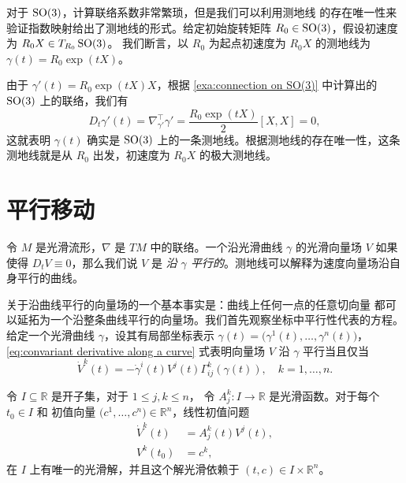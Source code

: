 \begin{example}[$\SO(3)$ 中的测地线]\label{exa:geodesics on SO(3)}
  对于 $\SO(3)$，计算联络系数非常繁琐，但是我们可以利用测地线
  的存在唯一性来验证指数映射给出了测地线的形式。给定初始旋转矩阵
  $R_0\in \operatorname{SO}(3)$，假设初速度为 $R_0X\in T_{R_0}\operatorname{SO}(3)$。
  我们断言，以 $R_0$ 为起点初速度为 $R_0 X$ 的测地线为 $\gamma(t)=R_0\exp(tX)$。

  由于 $\gamma'(t)=R_0\exp(tX) X$，根据 \autoref{exa:connection on SO(3)} 中计算出的 $\SO(3)$ 上的联络，我们有
  \[
    D_t\gamma'(t)=\nabla_{\gamma'}^\top\gamma'=
    \frac{R_0\exp(tX)}{2}[X,X]=0,
  \]
  这就表明 $\gamma(t)$ 确实是 $\SO(3)$ 上的一条测地线。根据测地线的存在唯一性，这条测地线就是从 $R_0$ 出发，初速度为 $R_0X$ 的极大测地线。
\end{example}


\section{平行移动}

令 $M$ 是光滑流形，$\nabla$ 是 $TM$ 中的联络。一个沿光滑曲线 $\gamma$
的光滑向量场 $V$ 如果使得 $D_tV\equiv 0$，那么我们说 $V$ 是
\emph{沿 $\gamma$ 平行的}。测地线可以解释为速度向量场沿自身平行的曲线。

关于沿曲线平行的向量场的一个基本事实是：曲线上任何一点的任意切向量
都可以延拓为一个沿整条曲线平行的向量场。我们首先观察坐标中平行性代表的方程。
给定一个光滑曲线 $\gamma$，设其有局部坐标表示 
$\gamma(t)=\bigl(\gamma^1(t),\dots,\gamma^n(t)\bigr)$，
\eqref{eq:convariant derivative along a curve} 式表明向量场 $V$ 
沿 $\gamma$ 平行当且仅当
\begin{equation}\label{eq:parallel transport equation}
  \dot V^k(t)=-\dot\gamma^i(t)V^j(t)\Gamma_{ij}^k(\gamma(t)),
  \quad k=1,\dots,n.
\end{equation}

\begin{theorem}
  令 $I\subseteq \mathbb{R}$ 是开子集，对于 $1\leq j,k\leq n$，
  令 $A_j^k:I\to \mathbb{R}$ 是光滑函数。对于每个 $t_0\in I$ 和
  初值向量 $\bigl(c^1,\dots,c^n\bigr)\in \mathbb{R}^n$，线性初值问题
  \begin{equation}
    \begin{aligned}
      \dot V^k(t)&=A_j^k(t)V^j(t),\\
      V^k(t_0)&=c^k,
    \end{aligned}
  \end{equation}
  在 $I$ 上有唯一的光滑解，并且这个解光滑依赖于 $(t,c)\in I\times \mathbb{R}^n$。
\end{theorem}

